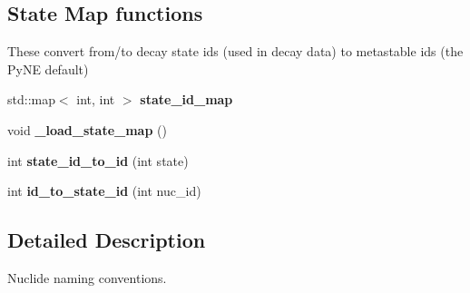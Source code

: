 \subsection*{State Map functions}
\label{_amgrp70bdf518b2e9e67e047a392686df556d}%
These convert from/to decay state ids (used in decay data) to metastable ids (the Py\-N\-E default) \begin{DoxyCompactItemize}
\item 
\hypertarget{namespacepyne_1_1nucname_a1bfcc87b4ac9c3f6634ea5a495871d7b}{std\-::map$<$ int, int $>$ {\bfseries state\-\_\-id\-\_\-map}}\label{namespacepyne_1_1nucname_a1bfcc87b4ac9c3f6634ea5a495871d7b}

\item 
\hypertarget{namespacepyne_1_1nucname_aa0f5efb8d3be5214acf8440dae8d4280}{void {\bfseries \-\_\-load\-\_\-state\-\_\-map} ()}\label{namespacepyne_1_1nucname_aa0f5efb8d3be5214acf8440dae8d4280}

\item 
\hypertarget{namespacepyne_1_1nucname_a91e9f43c7bfd01149545704c0a0d003a}{int {\bfseries state\-\_\-id\-\_\-to\-\_\-id} (int state)}\label{namespacepyne_1_1nucname_a91e9f43c7bfd01149545704c0a0d003a}

\item 
\hypertarget{namespacepyne_1_1nucname_aacc2935da529ea5f25324c17a3fba2d4}{int {\bfseries id\-\_\-to\-\_\-state\-\_\-id} (int nuc\-\_\-id)}\label{namespacepyne_1_1nucname_aacc2935da529ea5f25324c17a3fba2d4}

\end{DoxyCompactItemize}


\subsection{Detailed Description}
Nuclide naming conventions. 

